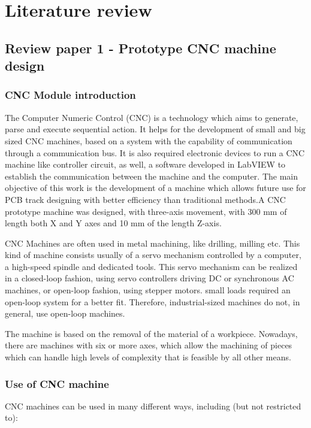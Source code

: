 \chapter{Literature review}

\section{Review paper 1 - Prototype CNC machine design}

\subsection{CNC Module introduction}
The Computer Numeric Control (CNC) is a technology which aims to generate, parse and execute sequential action. It helps for the development of small and big sized CNC machines, based on a system with the capability of communication through a communication bus. It is also required electronic devices to run a CNC machine like controller circuit, as well, a software developed in LabVIEW to establish the communication between the machine and the computer. The main objective of this work is the development of a machine which allows future use for PCB track designing with better efficiency than traditional methods.A CNC prototype machine was designed, with three-axis movement, with 300 mm of length both X and Y axes and 10 mm of the length Z-axis. \par

CNC Machines are often used in metal machining, like drilling, milling etc. This kind of machine consists usually of a servo mechanism controlled by a computer, a high-speed spindle and dedicated tools. This servo mechanism can be realized in a closed-loop fashion, using servo controllers driving DC or synchronous AC machines, or open-loop fashion, using stepper motors. small loads required an open-loop system for a better fit. Therefore, industrial-sized machines do not, in general, use open-loop machines. \par

The machine is based on the removal of the material of a workpiece. Nowadays, there are machines with six or more axes, which allow the machining of pieces which can handle high levels of complexity that is feasible by all other means.


\subsection{Use of CNC machine}
CNC machines can be used in many different ways, including (but not restricted to):

